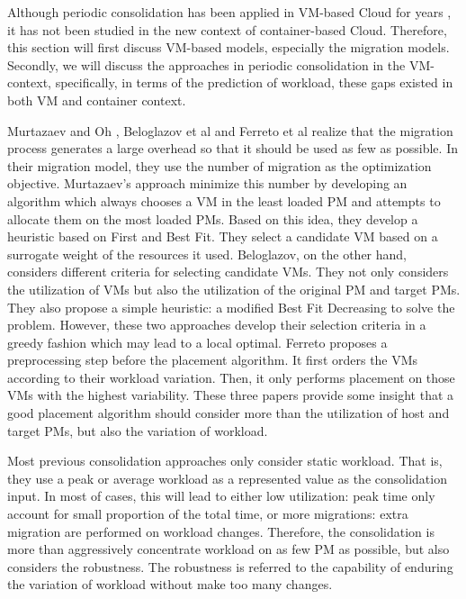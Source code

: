 Although periodic consolidation has been applied in VM-based Cloud for years \cite{Murtazaev:2014eo,Ferreto:2011ii}, it has not been studied in the new context of container-based Cloud. Therefore, this section will first discuss VM-based models, especially the migration models. Secondly, we will discuss the approaches in periodic consolidation in the VM-context, specifically, in terms of the prediction of workload, these gaps existed in both VM and container context. 


Murtazaev and Oh \cite{Murtazaev:2014eo}, Beloglazov et al \cite{Beloglazov:2012ji} and Ferreto et al \cite{Ferreto:2011ii} realize that the migration process generates a large overhead so that it should be used as few as possible. In their migration model, they use the number of migration as the optimization objective. Murtazaev's approach minimize this number by developing an algorithm which always chooses a VM in the least loaded PM and attempts to allocate them on the most loaded PMs. Based on this idea, they develop a heuristic based on First and Best Fit. They select a candidate VM based on a surrogate weight of the resources it used.
Beloglazov, on the other hand, considers different criteria for selecting candidate VMs. They not only considers the utilization of VMs but also the utilization of the original PM and target PMs. They also propose a simple heuristic: a modified Best Fit Decreasing to solve the problem. However, these two approaches develop their selection criteria in a greedy fashion which may lead to a local optimal. 
Ferreto proposes a preprocessing step before the placement algorithm. It first orders the VMs according to their workload variation. Then, it only performs placement on those VMs with  the highest variability. These three papers provide some insight that a good placement algorithm should consider more than the utilization of host and target PMs, but also the variation of workload. 

Most previous consolidation approaches \cite{Viswanathan:2012ej, Chen:2011fl,Feller:2011vs} only consider static workload. That is, they use a peak or average workload as a represented value as the consolidation input. In most of cases, this will lead to either low utilization: peak time only account for small proportion of the total time, or more migrations: extra migration are performed on workload changes. 
Therefore, the consolidation is more than aggressively concentrate workload on as few PM as possible, but also considers the robustness. The robustness is referred to the capability of enduring the variation of workload without make too many changes.

